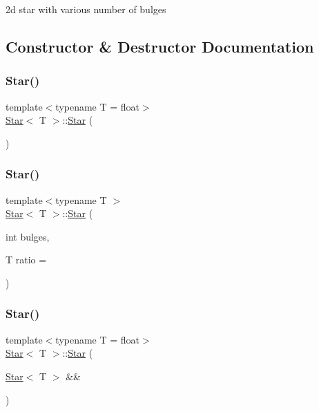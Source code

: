 2d star with various number of bulges 

\subsection{Constructor \& Destructor Documentation}
\mbox{\label{classStar_a4be07c82320f781071409294614df4ae}} 
\subsubsection{\texorpdfstring{Star()}{Star()}\hspace{0.1cm}{\footnotesize\ttfamily [1/4]}}
{\footnotesize\ttfamily template$<$typename T  = float$>$ \\
\mbox{\hyperlink{classStar}{Star}}$<$ T $>$\+::\mbox{\hyperlink{classStar}{Star}} (\begin{DoxyParamCaption}{ }\end{DoxyParamCaption})}

\mbox{\label{classStar_aa179936ed93e38e70992cb4f6e3cbff3}} 
\subsubsection{\texorpdfstring{Star()}{Star()}\hspace{0.1cm}{\footnotesize\ttfamily [2/4]}}
{\footnotesize\ttfamily template$<$typename T $>$ \\
\mbox{\hyperlink{classStar}{Star}}$<$ T $>$\+::\mbox{\hyperlink{classStar}{Star}} (\begin{DoxyParamCaption}\item[{int}]{bulges,  }\item[{T}]{ratio = {} }\end{DoxyParamCaption})}

\mbox{\label{classStar_af518471484341cad6b47ad42d4e637fe}} 
\subsubsection{\texorpdfstring{Star()}{Star()}\hspace{0.1cm}{\footnotesize\ttfamily [3/4]}}
{\footnotesize\ttfamily template$<$typename T  = float$>$ \\
\mbox{\hyperlink{classStar}{Star}}$<$ T $>$\+::\mbox{\hyperlink{classStar}{Star}} (\begin{DoxyParamCaption}\item[{\mbox{\hyperlink{classStar}{Star}}$<$ T $>$ \&\&}]{ }\end{DoxyParamCaption})\hspace{0.3cm}{\ttfamily [default]}}

